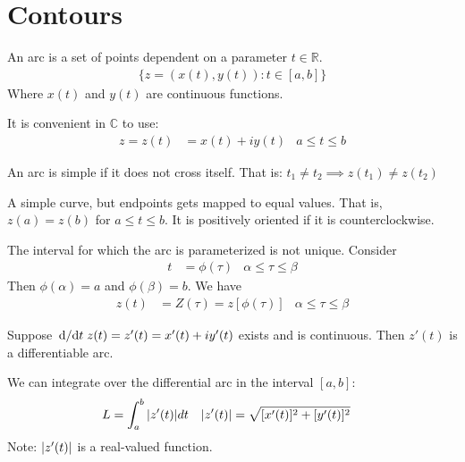 \documentclass[12pt, english]{book}
\begin{document}
	\section{Contours} \label{Contours Section - Complex}
	
	\begin{definition}[Arc]
		\label{Arc Definition - Complex}
		An arc is a set of points dependent on a parameter \(t \in \mathbb{R}\).
		\begin{align*}
			\{z = (x(t),y(t)) : t \in [a,b]\}
		\end{align*}
		Where \(x(t)\) and \(y(t)\) are continuous functions. 
	\end{definition}
	It is convenient in \(\mathbb{C}\) to use: 
	\begin{align*}
		 z = z(t) &= x(t) + iy(t)  & a \leq t \leq b
	\end{align*}
	
	\begin{definition}
		\label{Simple/Jordan Arc Definition - Complex}
		An arc is simple if it does not cross itself. That is:
		\(t_1 \neq t_2 \implies z(t_1) \neq z(t_2)\)
	\end{definition}
	
	\begin{definition}
		A simple curve, but endpoints gets mapped to equal values. That is, \(z(a) = z(b)\) for \(a \leq t \leq b\).
		It is positively oriented if it is counterclockwise. 
	\end{definition}

	The interval for which the arc is parameterized is not unique. Consider 
	\begin{align*}
		t &= \phi(\tau) & \alpha \leq \tau \leq \beta
	\end{align*}
	Then \(\phi(\alpha) = a\) and \(\phi(\beta)=b\). We have 
	\begin{align*}
		z(t) &= Z(\tau) = z[\phi(\tau)]& \alpha \leq \tau \leq \beta
	\end{align*}
	
	\begin{definition}
		\label{Differentiable Arc Definition - Complex}
		Suppose \(\dv*{t}z(t) = z'(t) = x'(t) + iy'(t)\) exists and is continuous. Then \(z'(t)\) is a differentiable arc.
	\end{definition}
	
	We can integrate over the differential arc in the interval \([a,b]\):
	\begin{align*}
		L &= \int_{a}^{b} \abs{z'(t)} dt	&	\abs{z'(t)} &= \sqrt{[x'(t)]^2 + [y'(t)]^2}
	\end{align*}
	Note: \(\abs{z'(t)}\) is a real-valued function. 
	
\end{document}
